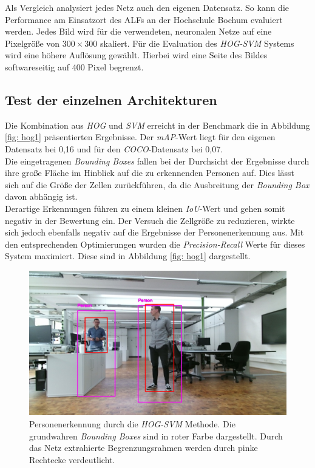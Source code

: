 Als Vergleich analysiert jedes Netz auch den eigenen Datensatz. So kann die Performance am Einsatzort des ALFs an der Hochschule Bochum evaluiert werden. Jedes Bild wird für die verwendeten, neuronalen Netze auf eine Pixelgröße von $300 \times 300$ skaliert. Für die Evaluation des \textit{HOG-SVM} Systems wird eine höhere Auflösung gewählt. Hierbei wird eine Seite des Bildes softwareseitig auf 400 Pixel begrenzt.

\subsection{Test der einzelnen Architekturen}

Die Kombination aus \textit{HOG} und \textit{SVM} erreicht in der Benchmark die in Abbildung \ref{fig: hog1} präsentierten Ergebnisse. Der \textit{mAP}-Wert liegt für den eigenen Datensatz bei 0,16 und für den \textit{COCO}-Datensatz bei 0,07.\\






 Die eingetragenen \textit{Bounding Boxes} fallen bei der Durchsicht der Ergebnisse durch ihre große Fläche im Hinblick auf die zu erkennenden Personen auf. Dies lässt sich auf die Größe der Zellen zurückführen, da die Ausbreitung der \textit{Bounding Box} davon abhängig ist.\\
 
 Derartige Erkennungen führen zu einem kleinen \textit{IoU}-Wert und gehen somit negativ in der Bewertung ein. Der Versuch die Zellgröße zu reduzieren, wirkte sich jedoch ebenfalls negativ auf die Ergebnisse der Personenerkennung aus. Mit den entsprechenden Optimierungen wurden die \textit{Precision-Recall} Werte für dieses System maximiert. Diese sind in Abbildung \ref{fig: hog1} dargestellt.\\
	\begin{figure}[H]
	\centering
	\includegraphics[width=1\textwidth]{Bilder/iouhog.png}
	\caption{Personenerkennung durch die \textit{HOG-SVM} Methode. Die grundwahren \textit{Bounding Boxes} sind in roter Farbe dargestellt. Durch das Netz extrahierte Begrenzungsrahmen werden durch pinke Rechtecke verdeutlicht.}
	\label{fig: hogiou}
\end{figure}

